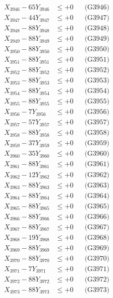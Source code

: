 \documentclass[a4paper,10pt]{article}
\begin{document}
{\begin{align}
X_{3946} - 65Y_{3946} &\leq +0 && \text{(G3946)} \\
X_{3947} - 44Y_{3947} &\leq +0 && \text{(G3947)} \\
X_{3948} - 88Y_{3948} &\leq +0 && \text{(G3948)} \\
X_{3949} - 88Y_{3949} &\leq +0 && \text{(G3949)} \\
X_{3950} - 88Y_{3950} &\leq +0 && \text{(G3950)} \\
\allowbreak
X_{3951} - 88Y_{3951} &\leq +0 && \text{(G3951)} \\
X_{3952} - 88Y_{3952} &\leq +0 && \text{(G3952)} \\
X_{3953} - 88Y_{3953} &\leq +0 && \text{(G3953)} \\
X_{3954} - 88Y_{3954} &\leq +0 && \text{(G3954)} \\
X_{3955} - 88Y_{3955} &\leq +0 && \text{(G3955)} \\
X_{3956} - 7Y_{3956} &\leq +0 && \text{(G3956)} \\
X_{3957} - 57Y_{3957} &\leq +0 && \text{(G3957)} \\
X_{3958} - 88Y_{3958} &\leq +0 && \text{(G3958)} \\
X_{3959} - 37Y_{3959} &\leq +0 && \text{(G3959)} \\
X_{3960} - 35Y_{3960} &\leq +0 && \text{(G3960)} \\
\allowbreak
X_{3961} - 88Y_{3961} &\leq +0 && \text{(G3961)} \\
X_{3962} - 12Y_{3962} &\leq +0 && \text{(G3962)} \\
X_{3963} - 88Y_{3963} &\leq +0 && \text{(G3963)} \\
X_{3964} - 88Y_{3964} &\leq +0 && \text{(G3964)} \\
X_{3965} - 88Y_{3965} &\leq +0 && \text{(G3965)} \\
X_{3966} - 88Y_{3966} &\leq +0 && \text{(G3966)} \\
X_{3967} - 88Y_{3967} &\leq +0 && \text{(G3967)} \\
X_{3968} - 19Y_{3968} &\leq +0 && \text{(G3968)} \\
X_{3969} - 88Y_{3969} &\leq +0 && \text{(G3969)} \\
X_{3970} - 88Y_{3970} &\leq +0 && \text{(G3970)} \\
\allowbreak
X_{3971} - 7Y_{3971} &\leq +0 && \text{(G3971)} \\
X_{3972} - 88Y_{3972} &\leq +0 && \text{(G3972)} \\
X_{3973} - 88Y_{3973} &\leq +0 && \text{(G3973)} \\

\end{align}}
\end{document}
